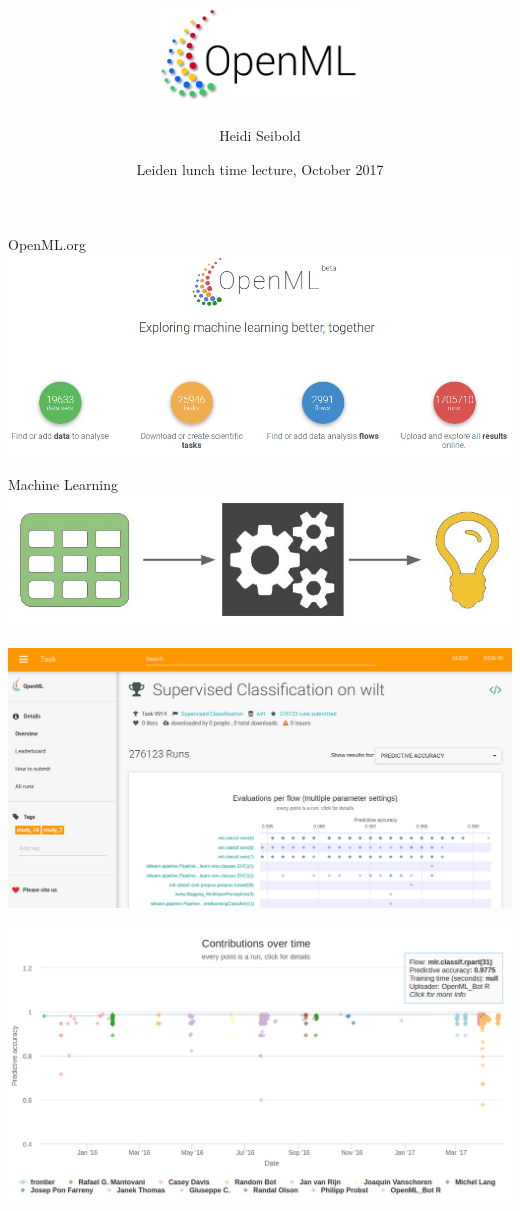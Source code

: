 \documentclass{beamer}
\author{Heidi Seibold}
\title{\includegraphics[width=0.4\textwidth]{OpenMLLogo}}
\date{Leiden lunch time lecture, October 2017}
\begin{document}
\thispagestyle{empty}
\begin{frame}
\transsplithorizontalout
\titlepage
\end{frame}

\begin{frame}[fragile]{OpenML.org}
\includegraphics[width = \textwidth]{screenshot}
\end{frame}

\begin{frame}[fragile]{Machine Learning}
\includegraphics[width = \textwidth]{ML}
\end{frame}


\begin{frame}[fragile]{}
\includegraphics[width = \textwidth]{task_wilt}
\end{frame}


\begin{frame}[fragile]{}
\includegraphics[width = \textwidth]{task_wilt_leaderboard}
\end{frame}
\end{document}
